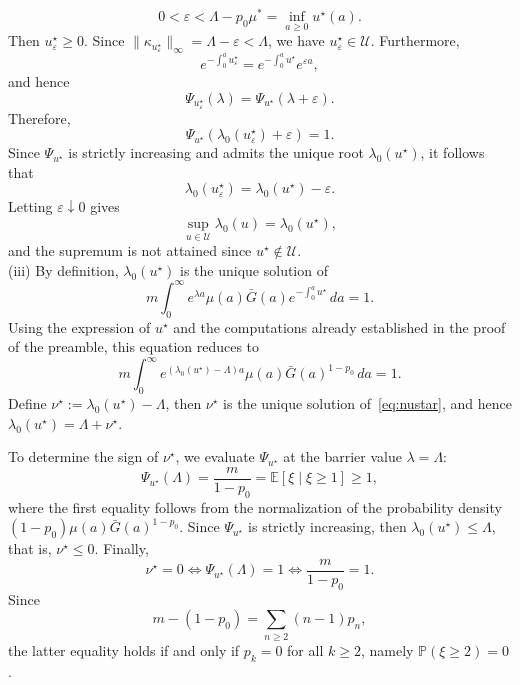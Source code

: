 \documentclass[letterpaper, 10pt, conference]{ieeeconf}
\makeatletter
\newcommand{\E}{\mathbb{E}}
\newcommand{\calU}{\mathcal{U}}
\newcommand{\Lbar}{\Lambda}
\newcommand{\rev}[1]{#1}
\newcommand{\ed}[1]{#1}
\newcommand{\edm}[1]{#1}
\renewenvironment{proof}[1][\proofname]{\par
  \pushQED{\qed}%
  \normalfont\topsep6\p@\@plus6\p@\relax
  \trivlist
  \item[\hskip\labelsep\itshape #1\@addpunct{.}]\ignorespaces
}{%
  \popQED\endtrivlist\@endpefalse
}
\renewenvironment{proof}[1][\proofname]{\par
  \pushQED{\qed}%
  \normalfont\topsep6\p@\@plus6\p@\relax
  \trivlist
  \item[\hskip\labelsep\itshape #1\@addpunct{.}]\ignorespaces
}{%
  \popQED\endtrivlist\@endpefalse
}
\makeatother
\begin{document}
\begin{proof}
{\[\edm{0<\varepsilon<\Lbar-p_0\mu^\ast=\inf_{a\ge0}u^\star(a).}
\]
\ed{Then $u^\star_\varepsilon\ge0$.}
Since $\|\kappa_{u^\star_\varepsilon}\|_\infty =\Lbar-\varepsilon<\Lbar$, we have $u^\star_\varepsilon\in\calU$. Furthermore,
\[
e^{-\int_0^au^\star_\varepsilon}
=
e^{-\int_0^au^\star}e^{\varepsilon a},
\]
and hence
\[
\Psi_{u^\star_\varepsilon}(\lambda)
=
\Psi_{u^\star}(\lambda+\varepsilon).
\]
Therefore,
\[
\Psi_{u^\star}
\!\left(
\lambda_0(u^\star_\varepsilon)+\varepsilon
\right)
=
1.
\]
Since $\Psi_{u^\star}$ is strictly increasing and admits the unique root
$\lambda_0(u^\star)$, it follows that
\[
\lambda_0(u^\star_\varepsilon)
=
\lambda_0(u^\star)-\varepsilon.
\]
Letting $\varepsilon\downarrow0$ gives
\[
\sup_{u\in\calU}\lambda_0(u)
=
\lambda_0(u^\star),
\]
and the supremum is not attained since $u^\star\notin\calU$.} \\
(iii) \rev{By definition, $\lambda_0(u^\star)$ is the unique solution of
\[
m\int_0^\infty
e^{\lambda a}\mu(a)\bar G(a)
e^{-\int_0^au^\star}\,da
=1.
\]
Using the expression of $u^\star$ and the computations already established
in the proof of the preamble, this equation reduces to
\[
m\int_0^\infty
e^{(\lambda_0(u^\star)-\Lbar)a}
\mu(a)\bar G(a)^{1-p_0}\,da
=1.
\]
Define $\nu^\star:=\lambda_0(u^\star)-\Lbar$, then $\nu^\star$ is the unique solution of~\eqref{eq:nustar}, and hence
$\lambda_0(u^\star)=\Lbar+\nu^\star$.

To determine the sign of $\nu^\star$, we evaluate $\Psi_{u^\star}$ at the
barrier value $\lambda=\Lbar$:
\[
\Psi_{u^\star}(\Lbar)
=
\frac{m}{1-p_0}
=
\E[\xi\mid\xi\ge1]
\ge1,
\]
where the first equality follows from the normalization of the probability density $(1-p_0)\mu(a)\bar G(a)^{1-p_0}$. Since
$\Psi_{u^\star}$ is strictly increasing, then $\lambda_0(u^\star)\le\Lbar$,
that is, $\nu^\star\le0$. Finally,
\[
\nu^\star=0
\iff
\Psi_{u^\star}(\Lbar)=1
\iff
\frac{m}{1-p_0}=1.
\]
Since
\[
m-(1-p_0)
=
\edm{\sum_{n\ge2}(n-1)p_n,}
\]
the latter equality holds if and only if $p_k=0$ for all $k\ge2$, namely $\mathbb P(\xi\ge2)=0$.}
\end{proof}
\end{document}
